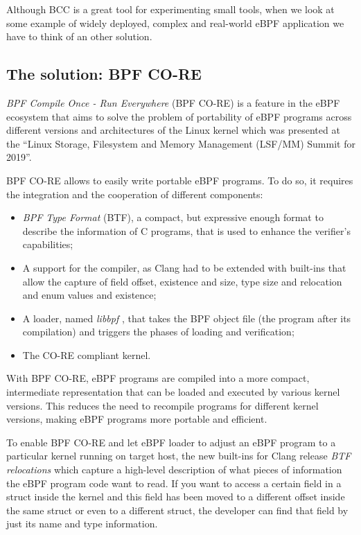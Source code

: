 Although BCC is a great tool for experimenting small tools, when we look at some example of widely deployed, complex and real-world eBPF application we have to think of an other solution.

\subsection{The solution: BPF CO-RE}

\textit{BPF Compile Once - Run Everywhere} (BPF CO-RE) is a feature in the eBPF ecosystem that aims to solve the problem of portability of eBPF programs across different versions and architectures of the Linux kernel which was presented at the ``Linux Storage, Filesystem and Memory Management (LSF/MM) Summit for 2019''.

BPF CO-RE allows to easily write portable eBPF programs.
To do so, it requires the integration and the cooperation of different components:

\begin{itemize}
	\item \textit{BPF Type Format} (BTF), a compact, but expressive enough format to
		describe the information of C programs, that is used to enhance the verifier's capabilities;
	\item A support for the compiler, as Clang  had to be extended with built-ins that
		allow the capture of field offset, existence and size, type size and relocation and enum values and existence;
	\item A loader, named \textit{libbpf} \cite{libbpfGitHub}, that takes the BPF
		object file (the program after its compilation) and triggers the phases of loading and verification;
	\item The CO-RE compliant kernel.
\end{itemize}

With BPF CO-RE, eBPF programs are compiled into a more compact, intermediate representation that can be loaded and executed by various kernel versions.
This reduces the need to recompile programs for different kernel versions, making eBPF programs more portable and efficient. 

To enable BPF CO-RE and let eBPF loader to adjust an eBPF program to a particular kernel running on target host, the new built-ins for Clang release \textit{BTF relocations} which capture a high-level description of what pieces of information the eBPF program code want to read.
If you want to access a certain field in a struct inside the kernel and this field has been moved to a different offset inside the same struct or even to a different struct, the developer can find that field by just its name and type information.

